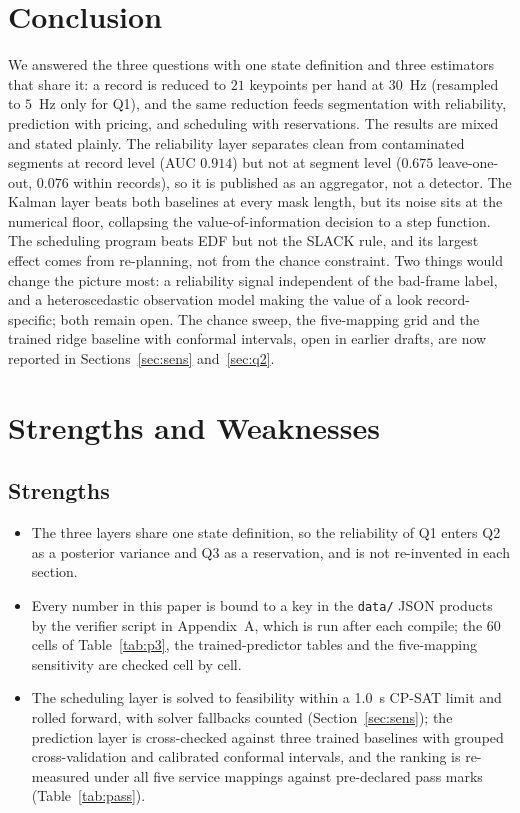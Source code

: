 \documentclass{swmcmthesis}
\begin{document}
\section{Conclusion}
We answered the three questions with one state definition and three estimators that share it: a record is reduced to $21$ keypoints per hand at $30$~Hz (resampled to $5$~Hz only for Q1), and the same reduction feeds segmentation with reliability, prediction with pricing, and scheduling with reservations. The results are mixed and stated plainly. The reliability layer separates clean from contaminated segments at record level (AUC $0.914$) but not at segment level ($0.675$ leave-one-out, $0.076$ within records), so it is published as an aggregator, not a detector. The Kalman layer beats both baselines at every mask length, but its noise sits at the numerical floor, collapsing the value-of-information decision to a step function. The scheduling program beats EDF but not the SLACK rule, and its largest effect comes from re-planning, not from the chance constraint. Two things would change the picture most: a reliability signal independent of the bad-frame label, and a heteroscedastic observation model making the value of a look record-specific; both remain open. The chance sweep, the five-mapping grid and the trained ridge baseline with conformal intervals, open in earlier drafts, are now reported in Sections~\ref{sec:sens} and~\ref{sec:q2}.

\section{Strengths and Weaknesses}
\subsection{Strengths}
\begin{itemize}
  \item The three layers share one state definition, so the reliability of Q1 enters Q2 as a posterior variance and Q3 as a reservation, and is not re-invented in each section.
  \item Every number in this paper is bound to a key in the \texttt{data/} JSON products by the verifier script in Appendix~A, which is run after each compile; the 60 cells of Table~\ref{tab:p3}, the trained-predictor tables and the five-mapping sensitivity are checked cell by cell.
  \item The scheduling layer is solved to feasibility within a 1.0~s CP-SAT limit and rolled forward, with solver fallbacks counted (Section~\ref{sec:sens}); the prediction layer is cross-checked against three trained baselines with grouped cross-validation and calibrated conformal intervals, and the ranking is re-measured under all five service mappings against pre-declared pass marks (Table~\ref{tab:pass}).
\end{itemize}
\end{document}
